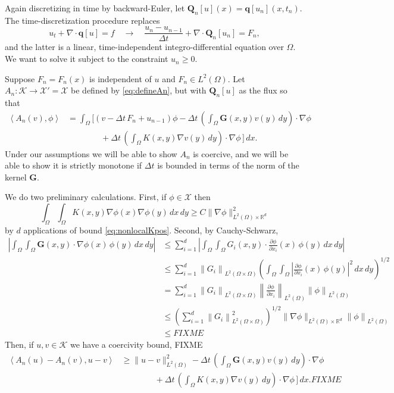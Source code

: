 \documentclass[final,leqno,onefignum,onetabnum]{siamltex1213bueler}
\newcommand\bG{\mathbf{G}}
\newcommand\bq{\mathbf{q}}
\newcommand\bQ{\mathbf{Q}}
\newcommand{\Div}{\nabla\cdot}
\renewcommand{\grad}{\nabla}
\newcommand{\ip}[2]{\ensuremath{\left<#1,#2\right>}}
\newcommand\RR{\mathbb{R}}
\begin{document}
Again discretizing in time by backward-Euler, let $\bQ_n[u](x)=\bq[u_n](x,t_n)$.  The time-discretization procedure replaces
	$$u_t + \Div \bq[u] = f \quad \to \quad \frac{u_n - u_{n-1}}{\Delta t} + \Div \bQ_n[u_n] = F_n,$$
and the latter is a linear, time-independent integro-differential equation over $\Omega$.  We want to solve it subject to the constraint $u_n\ge 0$.

Suppose $F_n=F_n(x)$ is independent of $u$ and $F_n\in L^2(\Omega)$.  Let $A_n:\mathcal{K} \to \mathcal{X}'=\mathcal{X}$ be defined by \eqref{eq:defineAn}, but with $\bQ_n[u]$ as the flux so that
\begin{align*}
    \ip{A_n(v)}{\phi} &= \int_\Omega \bigg[(v - \Delta t\,F_n + u_{n-1})\phi - \Delta t\,\left(\int_\Omega \bG(x,y) v(y)\,dy\right)\cdot \grad \phi \\
                      &\qquad\qquad + \Delta t\,\left(\int_\Omega K(x,y) \grad v(y)\,dy\right)\cdot \grad \phi\,\bigg]\,dx.
\end{align*}
Under our assumptions we will be able to show $A_n$ is coercive, and we will be able to show it is strictly monotone if $\Delta t$ is bounded in terms of the norm of the kernel $\bG$.

We do two preliminary calculations.  First, if $\phi\in\mathcal{X}$ then
\begin{equation*}
  \int_\Omega \int_\Omega K(x,y) \grad \phi(x) \grad \phi(y)\,dx\,dy \ge C \|\grad\phi\|_{L^2(\Omega)\times \RR^d}^2
\end{equation*}
by $d$ applications of bound \eqref{eq:nonlocalKpos}.  Second, by Cauchy-Schwarz,
\begin{align*}
\left|\int_\Omega \int_\Omega \bG(x,y) \cdot \grad \phi(x)\,\phi(y) \,dx\,dy\right| &\le \sum_{i=1}^d \left|\int_\Omega \int_\Omega G_i(x,y) \cdot \frac{\partial \phi}{\partial x_i} (x)\,\phi(y) \,dx\,dy\right| \\
  &\le \sum_{i=1}^d \left\|G_i\right\|_{L^2(\Omega \times \Omega)} \left(\int_\Omega \int_\Omega \left|\frac{\partial \phi}{\partial x_i} (x)\,\phi(y)\right|^2 \,dx\,dy\right)^{1/2} \\
  &= \sum_{i=1}^d \left\|G_i\right\|_{L^2(\Omega \times \Omega)} \left\|\frac{\partial \phi}{\partial x_i}\right\|_{L^2(\Omega)} \left\|\phi\right\|_{L^2(\Omega)} \\
  &\le \left(\sum_{i=1}^d \left\|G_i\right\|_{L^2(\Omega \times \Omega)}^2\right)^{1/2} \|\grad \phi\|_{L^2(\Omega)\times \RR^d} \left\|\phi\right\|_{L^2(\Omega)} \\
  &\le FIXME
\end{align*}
Then, if $u,v\in\mathcal{K}$ we have a coercivity bound, FIXME
\begin{align*}
    \ip{A_n(u)-A_n(v)}{u-v} &\ge \|u-v\|_{L^2(\Omega)}^2 - \Delta t\,\left(\int_\Omega \bG(x,y) v(y)\,dy\right)\cdot \grad \phi \\
                      &\qquad\qquad + \Delta t\,\left(\int_\Omega K(x,y) \grad v(y)\,dy\right)\cdot \grad \phi\,\bigg]\,dx. FIXME
\end{align*}
\end{document}
